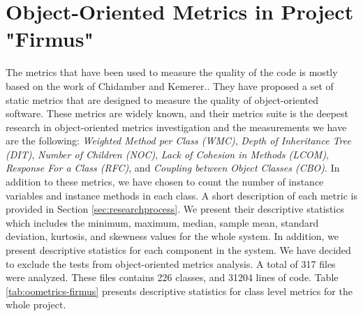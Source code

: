 \section{Object-Oriented Metrics in Project "Firmus"}
\label{sec:oometricsFirmus}
The metrics that have been used to measure the quality of the code is mostly based on the work of Chidamber and Kemerer.\cite{chidamber1994metrics}. They have proposed a set of static metrics that are designed to measure the quality of object-oriented software. These metrics are widely known, and their metrics suite is the deepest research in object-oriented metrics investigation and the measurements we have are the following: \textit{Weighted Method per Class (WMC)}, \textit{Depth of Inheritance Tree (DIT)}, \textit{Number of Children (NOC)}, \textit{Lack of Cohesion in Methods (LCOM)}, \textit{Response For a Class (RFC)}, and \textit{Coupling between Object Classes (CBO)}. In addition to these metrics, we have chosen to count the number of instance variables and instance methods in each class. A short description of each metric is provided in Section \ref{sec:researchprocess}. We present their descriptive statistics which includes the minimum, maximum, median, sample mean, standard deviation, kurtosis, and skewness values for the whole system. In addition, we present descriptive statistics for each component in the system. We have decided to exclude the tests from object-oriented metrics analysis. A total of 317 files were analyzed. These files contains 226 classes, and 31204 lines of code. Table \ref{tab:oometrics-firmus} presents descriptive statistics for class level metrics for the whole project.

